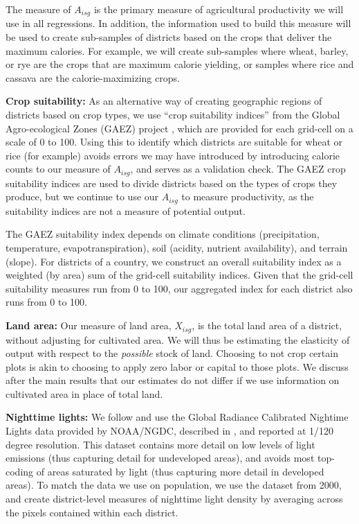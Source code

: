 \documentclass[11pt]{article}
\begin{document}
The measure of $A_{isg}$ is the primary measure of agricultural productivity we will use in all regressions. In addition, the information used to build this measure will be used to create sub-samples of districts based on the crops that deliver the maximum calories. For example, we will create sub-samples where wheat, barley, or rye are the crops that are maximum calorie yielding, or samples where rice and cassava are the calorie-maximizing crops.

\vspace{.5cm}\noindent\textbf{Crop suitability:} As an alternative way of creating geographic regions of districts based on crop types, we use ``crop suitability indices'' from the Global Agro-ecological Zones (GAEZ) project \citep{gaez}, which are provided for each grid-cell on a scale of 0 to 100. Using this to identify which districts are suitable for wheat or rice (for example) avoids errors we may have introduced by introducing calorie counts to our measure of $A_{isg}$, and serves as a validation check. The GAEZ crop suitability indices are used to divide districts based on the types of crops they produce, but we continue to use our $A_{isg}$ to measure productivity, as the suitability indices are not a measure of potential output.

The GAEZ suitability index depends on climate conditions (precipitation, temperature, evapotranspiration), soil (acidity, nutrient availability), and terrain (slope). For districts of a country, we construct an overall suitability index as a weighted (by area) sum of the grid-cell suitability indices. Given that the grid-cell suitability measures run from 0 to 100, our aggregated index for each district also runs from 0 to 100.

\vspace{.5cm}\noindent\textbf{Land area:} Our measure of land area, $X_{isg}$, is the total land area of a district, without adjusting for cultivated area. We will thus be estimating the elasticity of output with respect to the \textit{possible} stock of land. Choosing to not crop certain plots is akin to choosing to apply zero labor or capital to those plots. We discuss after the main results that our estimates do not differ if we use information on cultivated area in place of total land.

\vspace{.5cm}\noindent\textbf{Nighttime lights:} We follow \citet{hssw2016} and use the Global Radiance Calibrated Nightime Lights data provided by NOAA/NGDC, described in \citet{Elvidge1999}, and reported at 1/120 degree resolution. This dataset contains more detail on low levels of light emissions (thus capturing detail for undeveloped areas), and avoids most top-coding of areas saturated by light (thus capturing more detail in developed areas). To match the data we use on population, we use the dataset from 2000, and create district-level measures of nighttime light density by averaging across the pixels contained within each district.
\end{document}
